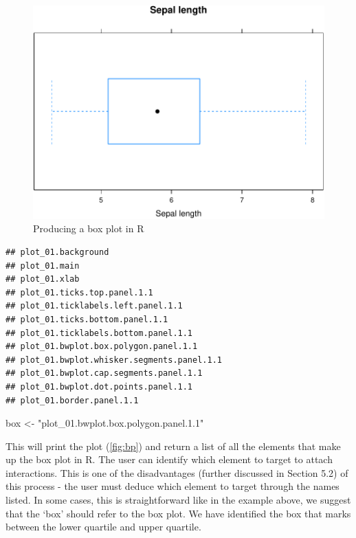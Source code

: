 \documentclass[11pt,]{report}
\newenvironment{Shaded}{\begin{snugshade}}{\end{snugshade}}
\newcommand{\StringTok}[1]{\textcolor[rgb]{0.31,0.60,0.02}{#1}}
\newcommand{\NormalTok}[1]{#1}
\begin{document}
\begin{figure}[H]

{\centering \includegraphics{figures/unnamed-chunk-48-1} 

}

\caption{\label{fig:bp} Producing a box plot in R}\label{fig:unnamed-chunk-48}
\end{figure}

\begin{verbatim}
## plot_01.background
## plot_01.main
## plot_01.xlab
## plot_01.ticks.top.panel.1.1
## plot_01.ticklabels.left.panel.1.1
## plot_01.ticks.bottom.panel.1.1
## plot_01.ticklabels.bottom.panel.1.1
## plot_01.bwplot.box.polygon.panel.1.1
## plot_01.bwplot.whisker.segments.panel.1.1
## plot_01.bwplot.cap.segments.panel.1.1
## plot_01.bwplot.dot.points.panel.1.1
## plot_01.border.panel.1.1
\end{verbatim}

\begin{Shaded}
\begin{Highlighting}[]
\NormalTok{box <-}\StringTok{ "plot_01.bwplot.box.polygon.panel.1.1"}
\end{Highlighting}
\end{Shaded}

This will print the plot (\autoref{fig:bp}) and return a list of all the
elements that make up the box plot in R. The user can identify which
element to target to attach interactions. This is one of the
disadvantages (further discussed in Section 5.2) of this process - the
user must deduce which element to target through the names listed. In
some cases, this is straightforward like in the example above, we
suggest that the `box' should refer to the box plot. We have identified
the box that marks between the lower quartile and upper quartile.
\end{document}
